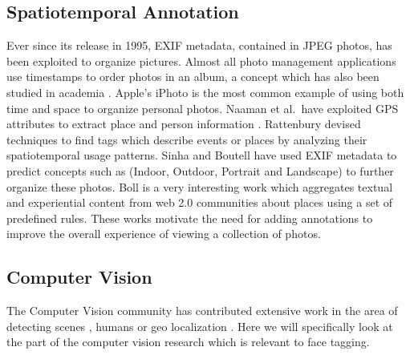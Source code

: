 \subsection{Spatiotemporal Annotation}
Ever since its release in 1995, EXIF metadata, contained in JPEG photos, has been exploited to organize pictures. Almost all photo management applications use timestamps to order photos in an album, a concept which has also been studied in academia \cite{graham2002time, hailpern2011youpivot}. Apple's iPhoto is the most common example of using both time and space to organize personal photos. Naaman et al.\ have exploited GPS attributes to extract place and person information \cite{naaman2005leveraging, naaman2005identity}. Rattenbury \cite{rattenbury2009methods} devised techniques to find tags which describe events or places by analyzing their spatiotemporal usage patterns. Sinha \cite{sinha2008concept} and Boutell \cite{boutell2005beyond} have used EXIF metadata to predict concepts such as (Indoor, Outdoor, Portrait and Landscape) to further organize these photos. Boll \cite{boll2007semantics} is a very interesting work which aggregates textual and experiential content from web 2.0 communities about places using a set of predefined rules. These works motivate the need for adding annotations to improve the overall experience of viewing a collection of photos.

\subsection{Computer Vision}

The Computer Vision community has contributed extensive work in the area of detecting scenes \cite{xiao2010sun}, humans \cite{dalal2005histograms} or geo localization \cite{hays2008im2gps}. Here we will specifically look at the part of the computer vision research which is relevant to face tagging.

